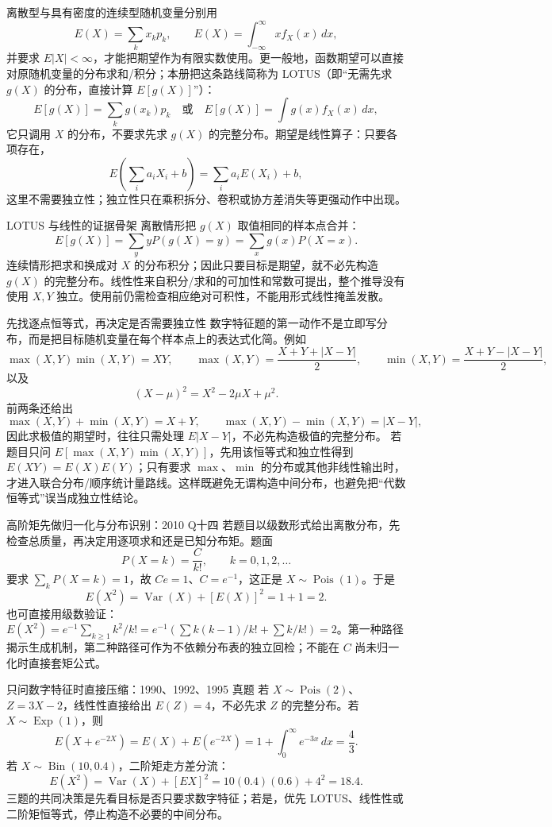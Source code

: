 \documentclass[11pt,a4paper]{ctexart}
\begin{document}
离散型与具有密度的连续型随机变量分别用
\[
E(X)=\sum_kx_kp_k,\qquad E(X)=\int_{-\infty}^{\infty}xf_X(x)\,dx,
\]
并要求 $E\lvert X\rvert<\infty$，才能把期望作为有限实数使用。更一般地，函数期望可以直接对原随机变量的分布求和/积分；本册把这条路线简称为 LOTUS（即“无需先求 $g(X)$ 的分布，直接计算 $E[g(X)]$”）：
\[
\boxed{E[g(X)]=\sum_kg(x_k)p_k\quad\text{或}\quad E[g(X)]=\int g(x)f_X(x)\,dx},
\]
它只调用 $X$ 的分布，不要求先求 $g(X)$ 的完整分布。期望是线性算子：只要各项存在，
\[
E\!\left(\sum_i a_iX_i+b\right)=\sum_i a_iE(X_i)+b,
\]
这里不需要独立性；独立性只在乘积拆分、卷积或协方差消失等更强动作中出现。

\begin{methodbox}{LOTUS 与线性的证据骨架}
离散情形把 $g(X)$ 取值相同的样本点合并：
\[
E[g(X)]=\sum_y yP(g(X)=y)=\sum_xg(x)P(X=x).
\]
连续情形把求和换成对 $X$ 的分布积分；因此只要目标是期望，就不必先构造 $g(X)$ 的完整分布。线性性来自积分/求和的可加性和常数可提出，整个推导没有使用 $X,Y$ 独立。使用前仍需检查相应绝对可积性，不能用形式线性掩盖发散。
\end{methodbox}
\begin{methodbox}{先找逐点恒等式，再决定是否需要独立性}
数字特征题的第一动作不是立即写分布，而是把目标随机变量在每个样本点上的表达式化简。例如
\[
\max(X,Y)\min(X,Y)=XY,
\qquad
\max(X,Y)=\frac{X+Y+\lvert X-Y\rvert}{2},
\qquad
\min(X,Y)=\frac{X+Y-\lvert X-Y\rvert}{2},
\]
以及
\[
(X-\mu)^2=X^2-2\mu X+\mu^2.
\]
前两条还给出
\[
\max(X,Y)+\min(X,Y)=X+Y,
\qquad
\max(X,Y)-\min(X,Y)=\lvert X-Y\rvert,
\]
因此求极值的期望时，往往只需处理 $E\lvert X-Y\rvert$，不必先构造极值的完整分布。
若题目只问 $E[\max(X,Y)\min(X,Y)]$，先用该恒等式和独立性得到 $E(XY)=E(X)E(Y)$；只有要求 $\max$、$\min$ 的分布或其他非线性输出时，才进入联合分布/顺序统计量路线。这样既避免无谓构造中间分布，也避免把“代数恒等式”误当成独立性结论。
\end{methodbox}

\begin{methodbox}{高阶矩先做归一化与分布识别：2010 Q十四}
若题目以级数形式给出离散分布，先检查总质量，再决定用逐项求和还是已知分布矩。题面
\[
P(X=k)=\frac{C}{k!},\qquad k=0,1,2,\ldots
\]
要求 $\sum_kP(X=k)=1$，故 $Ce=1$、$C=e^{-1}$，这正是 $X\sim\operatorname{Pois}(1)$。于是
\[
E(X^2)=\operatorname{Var}(X)+[E(X)]^2=1+1=2.
\]
也可直接用级数验证：$E(X^2)=e^{-1}\sum_{k\ge1}k^2/k!=e^{-1}(\sum k(k-1)/k!+\sum k/k!)=2$。第一种路径揭示生成机制，第二种路径可作为不依赖分布表的独立回检；不能在 $C$ 尚未归一化时直接套矩公式。
\end{methodbox}

\begin{examplebox}{只问数字特征时直接压缩：1990、1992、1995 真题}
若 $X\sim\operatorname{Pois}(2)$、$Z=3X-2$，线性性直接给出 $E(Z)=4$，不必先求 $Z$ 的完整分布。若 $X\sim\operatorname{Exp}(1)$，则
\[
E(X+e^{-2X})=E(X)+E(e^{-2X})=1+\int_0^\infty e^{-3x}\,dx=\frac43.
\]
若 $X\sim\operatorname{Bin}(10,0.4)$，二阶矩走方差分流：
\[
E(X^2)=\operatorname{Var}(X)+[EX]^2=10(0.4)(0.6)+4^2=18.4.
\]
三题的共同决策是先看目标是否只要求数字特征；若是，优先 LOTUS、线性性或二阶矩恒等式，停止构造不必要的中间分布。
\end{examplebox}
\end{document}
